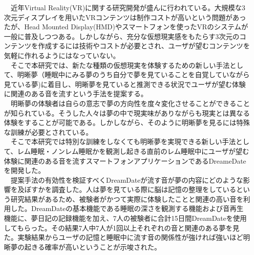 
\begin{jabstract}
　近年Virtual Reality(VR)に関する研究開発が盛んに行われている。大規模な3次元ディスプレイを用いたVRコンテンツは制作コストが高いという問題があったが、Head Mounted Display(HMD)やスマートフォンを使ったVRのシステムが一般に普及しつつある。しかしながら、充分な仮想現実感をもたらす3次元のコンテンツを作成するには技術やコストが必要とされ、ユーザが望むコンテンツを気軽に作れるようにはなっていない。\\
　そこで本研究では、新たな種類の仮想現実を体験するための新しい手法として、明晰夢（睡眠中にみる夢のうち自分で夢を見ていることを自覚していながら見ている夢)に着目し、明晰夢を見ていると推測できる状況でユーザが望む体験に関連のある音を流すという手法を提案する。\\
　明晰夢の体験者は自らの意志で夢の方向性を度々変化させることができることが知られている。そうした人々は夢の中で現実味がありながらも現実とは異なる体験をすることが可能である。しかしながら、そのように明晰夢を見るには特殊な訓練が必要とされている。 \\
　そこで本研究では特別な訓練をしなくても明晰夢を実現できる新しい手法として、レム睡眠・ノンレム睡眠かを観測し起きる直前のレム睡眠中にユーザが望む体験に関連のある音を流すスマートフォンアプリケーションであるDreameDateを開発した。\\
　提案手法の有効性を検証すべくDreamDateが流す音が夢の内容にどのような影響を及ぼすかを調査した。人は夢を見ている際に脳は記憶の整理をしているという研究結果があるため、被験者がかつて実際に体験したことと関連の高い音を利用した。DreamDateの基本機能である睡眠の深さを観測する機能および音再生機能に、夢日記の記録機能を加え、7人の被験者に合計15日間DreamDateを使用してもらった。その結果7人中7人が1回以上それぞれの音と関連のある夢を見た。実験結果からユーザの記憶と睡眠中に流す音の関係性が強ければ強いほど明晰夢の起きる確率が高いということが示唆された。


\end{jabstract}
